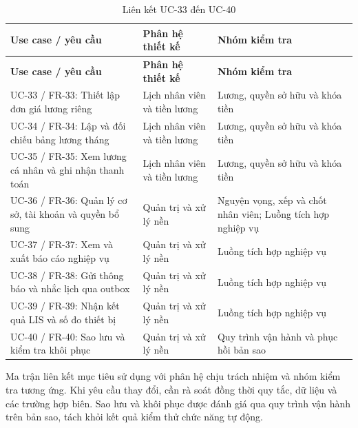 {\small\setlength{\tabcolsep}{3pt}\renewcommand{\arraystretch}{1.12}
\begin{longtable}{@{}L{\textwidth-4.8pt\relax} L{\textwidth-3.24pt\relax} L{\textwidth-3.96pt\relax}@{}}
\caption{Liên kết UC-33 đến UC-40}\\
\toprule
\textbf{Use case /\allowbreak{} yêu cầu} & \textbf{Phân hệ thiết kế} & \textbf{Nhóm kiểm tra}\\\midrule
\endfirsthead
\toprule
\textbf{Use case /\allowbreak{} yêu cầu} & \textbf{Phân hệ thiết kế} & \textbf{Nhóm kiểm tra}\\\midrule
\endhead
\bottomrule\endlastfoot
UC-33 /\allowbreak{} FR-33:\allowbreak{} Thiết lập đơn giá lương riêng & Lịch nhân viên và tiền lương & Lương, quyền sở hữu và khóa tiền\\[3pt]
UC-34 /\allowbreak{} FR-34:\allowbreak{} Lập và đối chiếu bảng lương tháng & Lịch nhân viên và tiền lương & Lương, quyền sở hữu và khóa tiền\\[3pt]
UC-35 /\allowbreak{} FR-35:\allowbreak{} Xem lương cá nhân và ghi nhận thanh toán & Lịch nhân viên và tiền lương & Lương, quyền sở hữu và khóa tiền\\[3pt]
UC-36 /\allowbreak{} FR-36:\allowbreak{} Quản lý cơ sở, tài khoản và quyền bổ sung & Quản trị và xử lý nền & Nguyện vọng, xếp và chốt nhân viên; Luồng tích hợp nghiệp vụ\\[3pt]
UC-37 /\allowbreak{} FR-37:\allowbreak{} Xem và xuất báo cáo nghiệp vụ & Quản trị và xử lý nền & Luồng tích hợp nghiệp vụ\\[3pt]
UC-38 /\allowbreak{} FR-38:\allowbreak{} Gửi thông báo và nhắc lịch qua outbox & Quản trị và xử lý nền & Luồng tích hợp nghiệp vụ\\[3pt]
UC-39 /\allowbreak{} FR-39:\allowbreak{} Nhận kết quả LIS và số đo thiết bị & Quản trị và xử lý nền & Luồng tích hợp nghiệp vụ\\[3pt]
UC-40 /\allowbreak{} FR-40:\allowbreak{} Sao lưu và kiểm tra khôi phục & Quản trị và xử lý nền & Quy trình vận hành và phục hồi bản sao\\[3pt]
\end{longtable}}
Ma trận liên kết mục tiêu sử dụng với phân hệ chịu trách nhiệm và nhóm kiểm tra tương ứng.\allowbreak{} Khi yêu cầu thay đổi, cần rà soát đồng thời quy tắc, dữ liệu và các trường hợp biên.\allowbreak{} Sao lưu và khôi phục được đánh giá qua quy trình vận hành trên bản sao, tách khỏi kết quả kiểm thử chức năng tự động.\allowbreak{}

